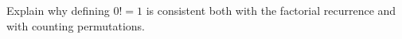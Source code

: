 Explain why defining $0!=1$ is consistent both with the factorial recurrence and with counting permutations.
